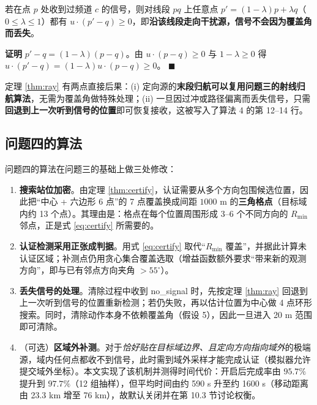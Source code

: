 \documentclass{cumcmthesis}
\newenvironment{pf}{\par\noindent\textbf{证明}\quad}{\hfill$\blacksquare$\par}
\begin{document}
\begin{theorem}[射线逼近引理]\label{thm:ray}
若在点 $p$ 处收到过频道 $c$ 的信号，则对线段 $pq$ 上任意点 $p'=(1-\lambda)p+\lambda q$（$0\le\lambda\le1$）都有 $u\cdot(p'-q)\ge0$，即\textbf{沿该线段走向干扰源，信号不会因为覆盖角而丢失}。
\end{theorem}
\begin{pf}
$p'-q=(1-\lambda)(p-q)$。由 $u\cdot(p-q)\ge0$ 与 $1-\lambda\ge0$ 得 $u\cdot(p'-q)=(1-\lambda)u\cdot(p-q)\ge0$。
\end{pf}

定理 \ref{thm:ray} 有两点直接后果：(i) 定向源的\textbf{末段归航可以复用问题三的射线归航算法}，无需为覆盖角做特殊处理；(ii) 一旦因过冲或路径偏离而丢失信号，只需\textbf{回退到上一次听到信号的位置}即可恢复接收，这被写入了算法 4 的第 12--14 行。

\subsection{问题四的算法}

问题四的算法在问题三的基础上做三处修改：

\begin{enumerate}
  \item \textbf{搜索站位加密}。由定理 \ref{thm:certify}，认证需要从多个方向包围候选位置，因此把“中心 + 六边形 6 点”的 7 点覆盖换成间距 $1000$ m 的\textbf{三角格点}（目标域内约 13 个点）。其理由是：格点在每个位置周围形成 3--6 个不同方向的 $R_{\min}$ 邻点，正是式 \eqref{eq:certify} 所需要的。
  \item \textbf{认证检测采用正张成判据}。用式 \eqref{eq:certify} 取代“$R_{\min}$ 覆盖”，并据此计算未认证区域；补测点仍用贪心集合覆盖选取（增益函数额外要求“带来新的观测方向”，即与已有邻点方向夹角 $>55^{\circ}$）。
  \item \textbf{丢失信号的处理}。清除过程中收到 no\_signal 时，先按定理 \ref{thm:ray} 回退到上一次听到信号的位置重新检测；若仍失败，再以估计位置为中心做 4 点环形搜索。同时，清除动作本身不依赖覆盖角（假设 5），因此一旦进入 20 m 范围即可清除。
  \item （可选）\textbf{区域外补测}。对于\emph{恰好贴在目标域边界、且定向方向指向域外}的极端源，域内任何点都收不到信号，此时需到域外采样才能完成认证（模拟器允许提交域外坐标）。本文实现了该机制并测得时间代价：开启后完成率由 $95.7\%$ 提升到 $97.7\%$（12 组抽样），但平均时间由约 590 s 升至约 1600 s（移动距离由 23.3 km 增至 76 km），故默认关闭并在第 10.3 节讨论权衡。
\end{enumerate}
\end{document}
